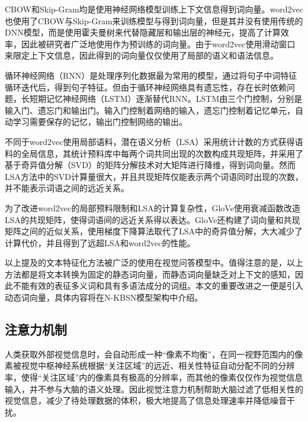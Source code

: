 CBOW和Skip-Gram均是使用神经网络模型训练上下文信息得到词向量。word2vec也使用了CBOW与Skip-Gram来训练模型与得到词向量，但是其并没有使用传统的DNN模型，而是使用霍夫曼树来代替隐藏层和输出层的神经元，提高了计算效率，因此被研究者广泛地使用作为预训练的词向量。由于word2vec使用滑动窗口来限定上下文信息，因此得到的词向量仅仅使用了局部的语义和语法信息。

循环神经网络（RNN）是处理序列化数据最为常用的模型，通过将句子中词特征循环迭代后，得到句子特征。但由于循环神经网络具有遗忘性，存在长时依赖问题，长短期记忆神经网络（LSTM）逐渐替代RNN。LSTM由三个门控制，分别是输入门、遗忘门和输出门。输入门控制着网络的输入，遗忘门控制着记忆单元，自动学习需要保存的记忆，输出门控制网络的输出。

不同于word2vec使用局部语料，潜在语义分析（LSA）采用统计计数的方式获得语料的全局信息，其统计预料库中每两个词共同出现的次数构成共现矩阵，并采用了基于奇异值分解（SVD）的矩阵分解技术对大矩阵进行降维，得到词向量。然而LSA方法中的SVD计算量很大，并且共现矩阵仅能表示两个词语同时出现的次数，并不能表示词语之间的远近关系。

为了改进word2vec的局部预料限制和LSA的计算复杂性，GloVe使用衰减函数改造LSA的共现矩阵，使得词语间的远近关系得以表达。GloVe还构建了词向量和共现矩阵之间的近似关系，使用梯度下降算法取代了LSA中的奇异值分解，大大减少了计算代价，并且得到了远超LSA和word2vec的性能。

以上提及的文本特征化方法被广泛的使用在视觉问答模型中。值得注意的是，以上方法都是将文本转换为固定的静态词向量，而静态词向量缺乏对上下文的感知，因此不能有效的表征多义词和具有多语法成分的词组。本文的重要改进之一便是引入动态词向量，具体内容将在N-KBSN模型架构中介绍。

\subsection{注意力机制}
人类获取外部视觉信息时，会自动形成一种“像素不均衡”，在同一视野范围内的像素被视觉中枢神经系统根据“关注区域”的远近、相关性特征自动分配不同的分辨率，使得“关注区域”内的像素具有极高的分辨率，而其他的像素仅仅作为视觉信息输入，并不参与大脑的语义处理。因此视觉注意力机制帮助大脑过滤了低相关性的视觉信息，减少了待处理数据的体积，极大地提高了信息处理速率并降低噪音干扰。

